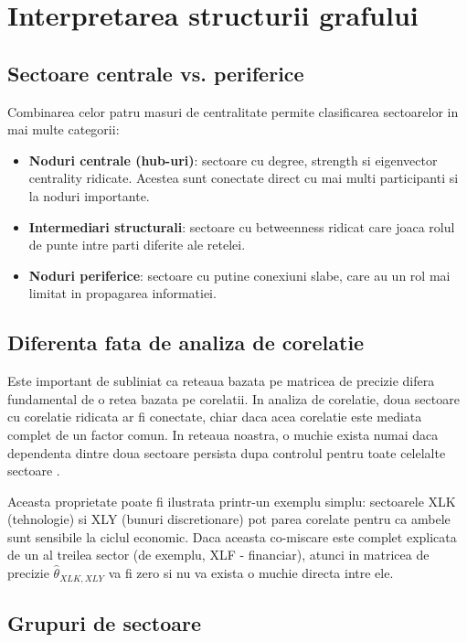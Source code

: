 \section{Interpretarea structurii grafului}

\subsection{Sectoare centrale vs. periferice}

Combinarea celor patru masuri de centralitate permite clasificarea sectoarelor
in mai multe categorii:

\begin{itemize}
    \item \textbf{Noduri centrale (hub-uri)}: sectoare cu degree, strength si
    eigenvector centrality ridicate. Acestea sunt conectate direct cu mai multi
    participanti si la noduri importante.
    \item \textbf{Intermediari structurali}: sectoare cu betweenness ridicat
    care joaca rolul de punte intre parti diferite ale retelei.
    \item \textbf{Noduri periferice}: sectoare cu putine conexiuni slabe, care
    au un rol mai limitat in propagarea informatiei.
\end{itemize}

\subsection{Diferenta fata de analiza de corelatie}

Este important de subliniat ca reteaua bazata pe matricea de precizie
difera fundamental de o retea bazata pe corelatii. In analiza de corelatie,
doua sectoare cu corelatie ridicata ar fi conectate, chiar daca acea corelatie
este mediata complet de un factor comun. In reteaua noastra, o muchie exista
numai daca dependenta dintre doua sectoare persista dupa controlul pentru
toate celelalte sectoare \citep{lauritzen1996,friedman2008}.

Aceasta proprietate poate fi ilustrata printr-un exemplu simplu: sectoarele
XLK (tehnologie) si XLY (bunuri discretionare) pot parea corelate pentru ca
ambele sunt sensibile la ciclul economic. Daca aceasta co-miscare este complet
explicata de un al treilea sector (de exemplu, XLF - financiar), atunci in
matricea de precizie $\hat{\theta}_{XLK, XLY}$ va fi zero si nu va exista
o muchie directa intre ele.

\subsection{Grupuri de sectoare}

